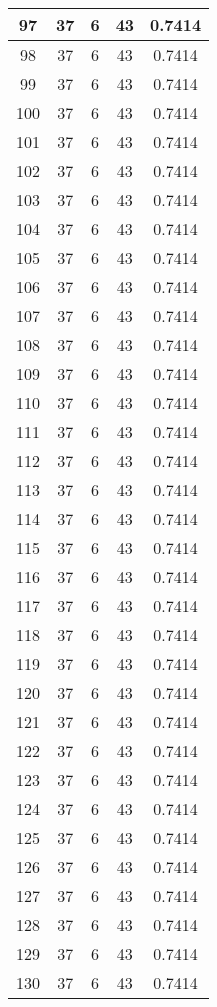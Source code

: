 \documentclass[letterpaper, 12pt]{article}
\begin{document}
\begin{longtable}{|c|c|c|c|c|}
\hline
97 & 37 & 6 & 43 & 0.7414 \\
\hline
98 & 37 & 6 & 43 & 0.7414 \\
\hline
99 & 37 & 6 & 43 & 0.7414 \\
\hline
100 & 37 & 6 & 43 & 0.7414 \\
\hline
101 & 37 & 6 & 43 & 0.7414 \\
\hline
102 & 37 & 6 & 43 & 0.7414 \\
\hline
103 & 37 & 6 & 43 & 0.7414 \\
\hline
104 & 37 & 6 & 43 & 0.7414 \\
\hline
105 & 37 & 6 & 43 & 0.7414 \\
\hline
106 & 37 & 6 & 43 & 0.7414 \\
\hline
107 & 37 & 6 & 43 & 0.7414 \\
\hline
108 & 37 & 6 & 43 & 0.7414 \\
\hline
109 & 37 & 6 & 43 & 0.7414 \\
\hline
110 & 37 & 6 & 43 & 0.7414 \\
\hline
111 & 37 & 6 & 43 & 0.7414 \\
\hline
112 & 37 & 6 & 43 & 0.7414 \\
\hline
113 & 37 & 6 & 43 & 0.7414 \\
\hline
114 & 37 & 6 & 43 & 0.7414 \\
\hline
115 & 37 & 6 & 43 & 0.7414 \\
\hline
116 & 37 & 6 & 43 & 0.7414 \\
\hline
117 & 37 & 6 & 43 & 0.7414 \\
\hline
118 & 37 & 6 & 43 & 0.7414 \\
\hline
119 & 37 & 6 & 43 & 0.7414 \\
\hline
120 & 37 & 6 & 43 & 0.7414 \\
\hline
121 & 37 & 6 & 43 & 0.7414 \\
\hline
122 & 37 & 6 & 43 & 0.7414 \\
\hline
123 & 37 & 6 & 43 & 0.7414 \\
\hline
124 & 37 & 6 & 43 & 0.7414 \\
\hline
125 & 37 & 6 & 43 & 0.7414 \\
\hline
126 & 37 & 6 & 43 & 0.7414 \\
\hline
127 & 37 & 6 & 43 & 0.7414 \\
\hline
128 & 37 & 6 & 43 & 0.7414 \\
\hline
129 & 37 & 6 & 43 & 0.7414 \\
\hline
130 & 37 & 6 & 43 & 0.7414 \\

\end{longtable}
\end{document}
